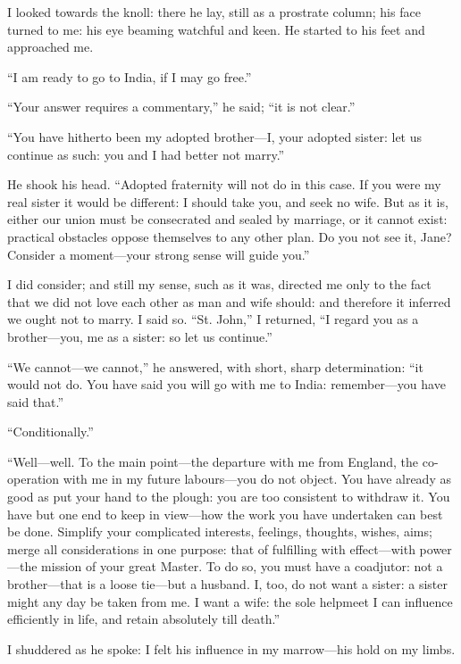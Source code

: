 I looked towards the knoll: there he lay, still as a prostrate column;
his face turned to me: his eye beaming watchful and keen. He started to
his feet and approached me.

\enquote{I am ready to go to India, if I may go free.}

\enquote{Your answer requires a commentary,} he said; \enquote{it is not
	clear.}

\enquote{You have hitherto been my adopted brother---I, your adopted
	sister: let us continue as such: you and I had better not marry.}

He shook his head. \enquote{Adopted fraternity will not do in this
	case. If you were my real sister it would be different: I should take
	you, and seek no wife. But as it is, either our union must be
	consecrated and sealed by marriage, or it cannot exist: practical
	obstacles oppose themselves to any other plan. Do you not see it,
	Jane? Consider a moment---your strong sense will guide you.}

I did consider; and still my sense, such as it was, directed me only to
the fact that we did not love each other as man and wife should: and
therefore it inferred we ought not to marry. I said so. \enquote{St.
	John,} I returned, \enquote{I regard you as a brother---you, me as a
	sister: so let us continue.}

\enquote{We cannot---we cannot,} he answered, with short, sharp
determination: \enquote{it would not do. You have said you will go with
	me to India: remember---you have said that.}

\enquote{Conditionally.}

\enquote{Well---well. To the main point---the departure with me from
	England, the co-operation with me in my future labours---you do not
	object. You have already as good as put your hand to the plough: you
	are too consistent to withdraw it. You have but one end to keep in
	view---how the work you have undertaken can best be done. Simplify your
	complicated interests, feelings, thoughts, wishes, aims; merge all
	considerations in one purpose: that of fulfilling with effect---with
	power---the mission of your great Master. To do so, you must have a
	coadjutor: not a brother---that is a loose tie---but a husband. I, too,
	do not want a sister: a sister might any day be taken from me. I want a
	wife: the sole helpmeet I can influence efficiently in life, and retain
	absolutely till death.}

I shuddered as he spoke: I felt his influence in my marrow---his hold on
my limbs.

